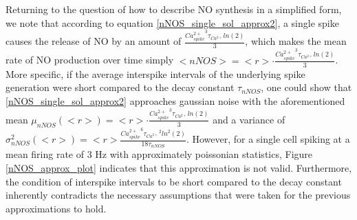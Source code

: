 \documentclass[10pt,a4paper]{article}
\begin{document}
Returning to the question of how to describe NO synthesis in a simplified form, we note that according to equation \eqref{nNOS_single_sol_approx2}, a single spike causes the release of NO by an amount of $\frac{{Ca^{2+}_{spike}}^3 \tau_{Ca^{2+}}ln(2)}{3}$, which makes the mean rate of NO production over time simply $<nNOS> = <r> \cdot \frac{{Ca^{2+}_{spike}}^3 \tau_{Ca^{2+}}ln(2)}{3}$. More specific, if the average interspike intervals of the underlying spike generation were short compared to the decay constant $\tau_{nNOS}$, one could show that \eqref{nNOS_single_sol_approx2} approaches gaussian noise with the aforementioned mean $\mu_{nNOS}(<r>) =  <r> \cdot \frac{{Ca^{2+}_{spike}}^3 \tau_{Ca^{2+}}ln(2)}{3}$ and a variance of $\sigma^2_{nNOS}(<r>) = <r> \frac{{Ca^{2+}_{spike}}^6 {\tau_{Ca^{2+}}}^2 ln^2(2)}{18\tau_{nNOS}}$. However, for a single cell spiking at a mean firing rate of 3 Hz with approximately poissonian statistics, Figure \ref{nNOS_approx_plot} indicates that this approximation is not valid. Furthermore, the condition of interspike intervals to be short compared to the decay constant inherently contradicts the necessary assumptions that were taken for the previous approximations to hold.
\end{document}

